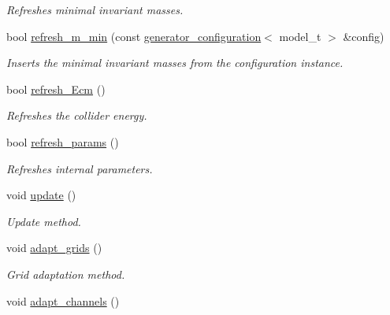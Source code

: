 \begin{DoxyCompactItemize}
\begin{DoxyCompactList}\small\item\em Refreshes minimal invariant masses. \end{DoxyCompactList}\item 
bool \hyperlink{a00210_abab5dcad611c677ee640a82a0f4020c8}{refresh\-\_\-m\-\_\-min} (const \hyperlink{a00237}{generator\-\_\-configuration}$<$ model\-\_\-t $>$ \&config)
\begin{DoxyCompactList}\small\item\em Inserts the minimal invariant masses from the configuration instance. \end{DoxyCompactList}\item 
\hypertarget{a00210_a8bf0d938af278477e00b096ece4a9af1}{bool \hyperlink{a00210_a8bf0d938af278477e00b096ece4a9af1}{refresh\-\_\-\-Ecm} ()}\label{a00210_a8bf0d938af278477e00b096ece4a9af1}

\begin{DoxyCompactList}\small\item\em Refreshes the collider energy. \end{DoxyCompactList}\item 
\hypertarget{a00210_aa8ffb17e3fc087485af4e62493e299c1}{bool \hyperlink{a00210_aa8ffb17e3fc087485af4e62493e299c1}{refresh\-\_\-params} ()}\label{a00210_aa8ffb17e3fc087485af4e62493e299c1}

\begin{DoxyCompactList}\small\item\em Refreshes internal parameters. \end{DoxyCompactList}\item 
\hypertarget{a00210_a098839f6765c509366d5b4f4db22b762}{void \hyperlink{a00210_a098839f6765c509366d5b4f4db22b762}{update} ()}\label{a00210_a098839f6765c509366d5b4f4db22b762}

\begin{DoxyCompactList}\small\item\em Update method. \end{DoxyCompactList}\item 
\hypertarget{a00210_ab6f503920b9a99fc579cb868f2678127}{void \hyperlink{a00210_ab6f503920b9a99fc579cb868f2678127}{adapt\-\_\-grids} ()}\label{a00210_ab6f503920b9a99fc579cb868f2678127}

\begin{DoxyCompactList}\small\item\em Grid adaptation method. \end{DoxyCompactList}\item 
\hypertarget{a00210_af6256418b88f029197e80ff36c176c59}{void \hyperlink{a00210_af6256418b88f029197e80ff36c176c59}{adapt\-\_\-channels} ()}\label{a00210_af6256418b88f029197e80ff36c176c59}


\end{DoxyCompactItemize}

